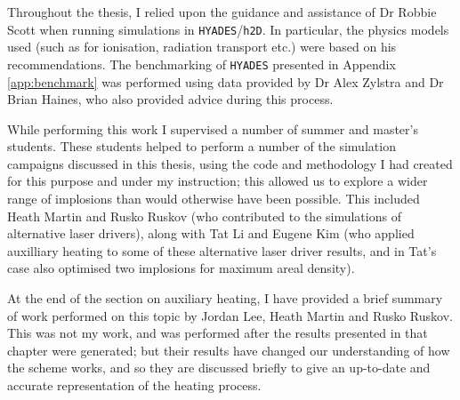Throughout the thesis, I relied upon the guidance and assistance of Dr Robbie Scott when running simulations in \texttt{HYADES}/\texttt{h2D}. In particular, the physics models used (such as for ionisation, radiation transport etc.) were based on his recommendations. The benchmarking of \texttt{HYADES} presented in Appendix \ref{app:benchmark} was performed using data provided by Dr Alex Zylstra and Dr Brian Haines, who also provided advice during this process.

While performing this work I supervised a number of summer and master's students. These students helped to perform a number of the simulation campaigns discussed in this thesis, using the code and methodology I had created for this purpose and under my instruction; this allowed us to explore a wider range of implosions than would otherwise have been possible. This included Heath Martin and Rusko Ruskov (who contributed to the simulations of alternative laser drivers), along with Tat Li and Eugene Kim (who applied auxilliary heating to some of these alternative laser driver results, and in Tat's case also optimised two implosions for maximum areal density).

At the end of the section on auxiliary heating, I have provided a brief summary of work performed on this topic by Jordan Lee, Heath Martin and Rusko Ruskov. This was not my work, and was performed after the results presented in that chapter were generated; but their results have changed our understanding of how the scheme works, and so they are discussed briefly to give an up-to-date and accurate representation of the heating process.


